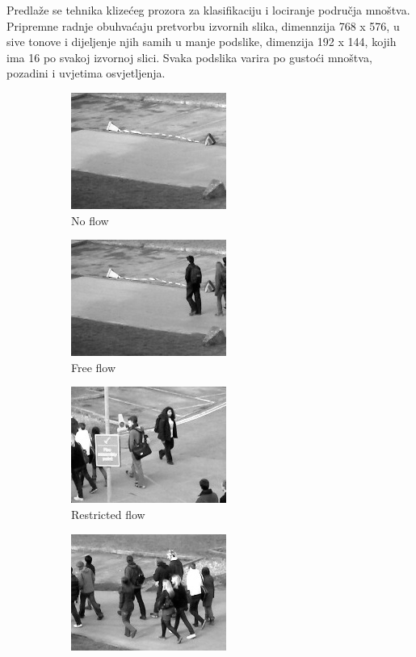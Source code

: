 \documentclass[times, utf8, zavrsni]{fer}
\begin{document}
Predlaže se tehnika klizećeg prozora za klasifikaciju i lociranje područja
mnoštva. Pripremne radnje obuhvaćaju pretvorbu izvornih slika, dimennzija
768 x 576, u sive tonove i dijeljenje njih samih u manje podslike, dimenzija
192 x 144, kojih ima 16 po svakoj izvornoj slici. Svaka podslika varira
po gustoći mnoštva, pozadini i uvjetima osvjetljenja.  


\begin{figure}[ht]
	\begin{subfigure}[b]{0.19\linewidth}
		\centering
		\includegraphics[scale=0.5]{img/noflow.jpg}
		\caption{No flow}
	\end{subfigure}
	\begin{subfigure}[b]{0.19\linewidth}
		\centering
		\includegraphics[scale=0.5]{img/freeflow.jpg}
		\caption{Free flow}
	\end{subfigure}
	\begin{subfigure}[b]{0.19\linewidth}
		\centering
		\includegraphics[scale=0.5]{img/restrictedflow.jpg}
		\caption{Restricted flow}
	\end{subfigure}
	\begin{subfigure}[b]{0.19\linewidth}
		\centering
		\includegraphics[scale=0.5]{img/denseflow.jpg}

\end{subfigure}
\end{figure}
\end{document}
